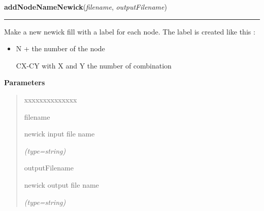 \hspace{.8\funcindent}\begin{boxedminipage}{\funcwidth}

    \raggedright \textbf{addNodeNameNewick}(\textit{filename}, \textit{outputFilename})

    \vspace{-1.5ex}

    \rule{\textwidth}{0.5\fboxrule}
\setlength{\parskip}{2ex}
    Make a new newick fill with a label for each node. The label is created
    like this :

    \begin{itemize}
    \setlength{\parskip}{0.6ex}
      \item N + the number of the node

      \item [CX-CY] with X and Y the number of combination

    \end{itemize}

\setlength{\parskip}{1ex}
      \textbf{Parameters}
      \vspace{-1ex}

      \begin{quote}
        \begin{Ventry}{xxxxxxxxxxxxxx}

          \item[filename]

          newick input file name

            {\it (type=string)}

          \item[outputFilename]

          newick output file name

            {\it (type=string)}

        \end{Ventry}

      \end{quote}

    \end{boxedminipage}

    \label{script-phyloFixedVar:makeXML}

    \vspace{0.5ex}

